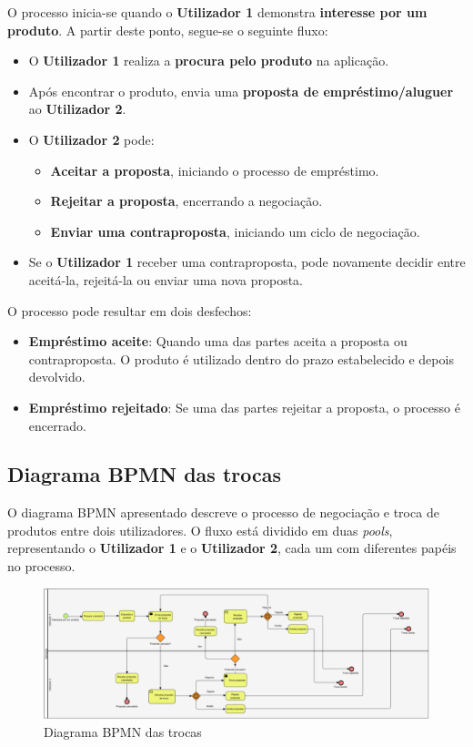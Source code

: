 \documentclass[a4paper, 12pt]{article} %
\begin{document}
O processo inicia-se quando o \textbf{Utilizador 1} demonstra \textbf{interesse por um produto}. A partir deste ponto, segue-se o seguinte fluxo:

\begin{itemize}
	\item O \textbf{Utilizador 1} realiza a \textbf{procura pelo produto} na aplicação.
	\item Após encontrar o produto, envia uma \textbf{proposta de empréstimo/aluguer} ao \textbf{Utilizador 2}.
	\item O \textbf{Utilizador 2} pode:
	\begin{itemize}
		\item \textbf{Aceitar a proposta}, iniciando o processo de empréstimo.
		\item \textbf{Rejeitar a proposta}, encerrando a negociação.
		\item \textbf{Enviar uma contraproposta}, iniciando um ciclo de negociação.
	\end{itemize}
	\item Se o \textbf{Utilizador 1} receber uma contraproposta, pode novamente decidir entre aceitá-la, rejeitá-la ou enviar uma nova proposta.
\end{itemize}

O processo pode resultar em dois desfechos:
\begin{itemize}
	\item \textbf{Empréstimo aceite}: Quando uma das partes aceita a proposta ou contraproposta. O produto é utilizado dentro do prazo estabelecido e depois devolvido.
	\item \textbf{Empréstimo rejeitado}: Se uma das partes rejeitar a proposta, o processo é encerrado.
\end{itemize}

\subsection{Diagrama BPMN das trocas}

O diagrama BPMN apresentado descreve o processo de negociação e troca de produtos entre dois utilizadores. O fluxo está dividido em duas \textit{pools}, representando o \textbf{Utilizador 1} e o \textbf{Utilizador 2}, cada um com diferentes papéis no processo.

\begin{figure}[ht]
	\centering
	\includegraphics[width=\textwidth]{../images/bpmn-swaps.png}
	\caption{Diagrama BPMN das trocas}
	\label{fig:bpmn trocas}
\end{figure}
\end{document}
